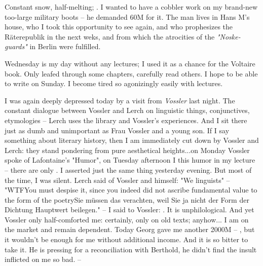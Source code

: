 
Constant snow, half-melting; . I wanted to have a cobbler work on my brand-new too-large military boots -- he demanded 60M for it. The man lives in Hans M's house, who I took this opportunity to see again, and who prophesizes the Räterepublik in the next weks, and from which the atrocities of the \textit{"Noske-guards"} in Berlin were fulfilled.

Wednesday is my day without any lectures; I used it as a chance for the Voltaire book. Only leafed through some chapters, carefully read others. I hope to be able to write on Sunday. I become tired so agonizingly easily with  lectures.

I was again deeply depressed today by a visit from \textit{Vossler} last night. The constant dialogue between Vossler and Lerch on linguistic things, conjunctives, etymologies -- Lerch uses the library and Vossler's experiences. And I sit there just as dumb and unimportant as Frau Vossler and a young son. If I say something about literary history, then I am immediately cut down by Vossler and Lerch: they stand pondering from pure aesthetical heights...on Monday Vossler spoke of Lafontaine's "Humor", on Tuesday afternoon I  this humor in my lecture -- there are only . I asserted just the same thing yesterday evening. But most of the time, I was silent. Lerch said of Vossler and himself: "We linguists" -- "WTF{You must despise it, since you indeed did not ascribe fundamental value to the form of the poetry}{Sie müssen das verachten, weil Sie ja nicht der Form der Dichtung Hauptwert beilegen}." -- I said to Vossler: . It is unphilological. And yet Vossler only half-comforted me: certainly, only on old texts; anyhow... I am on the market and remain dependent. Today Georg gave me another 2000M -- , but it wouldn't be enough for me without additional income. And it is so bitter to take it. He is pressing for a reconciliation with Berthold, he didn't find the insult inflicted on me so bad. -- \missing



